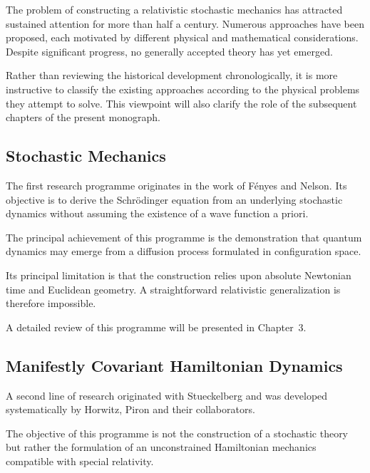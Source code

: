 The problem of constructing a relativistic stochastic mechanics has
attracted sustained attention for more than half a century. Numerous
approaches have been proposed, each motivated by different physical and
mathematical considerations. Despite significant progress, no generally
accepted theory has yet emerged.

Rather than reviewing the historical development chronologically, it is
more instructive to classify the existing approaches according to the
physical problems they attempt to solve. This viewpoint will also
clarify the role of the subsequent chapters of the present monograph.

\subsection{Stochastic Mechanics}

The first research programme originates in the work of Fényes and
Nelson. Its objective is to derive the Schrödinger equation from an
underlying stochastic dynamics without assuming the existence of a wave
function a priori.

The principal achievement of this programme is the demonstration that
quantum dynamics may emerge from a diffusion process formulated in
configuration space.

Its principal limitation is that the construction relies upon absolute
Newtonian time and Euclidean geometry. A straightforward relativistic
generalization is therefore impossible.

A detailed review of this programme will be presented in Chapter~3.

\subsection{Manifestly Covariant Hamiltonian Dynamics}

A second line of research originated with Stueckelberg and was developed
systematically by Horwitz, Piron and their collaborators.

The objective of this programme is not the construction of a stochastic
theory but rather the formulation of an unconstrained Hamiltonian
mechanics compatible with special relativity.

